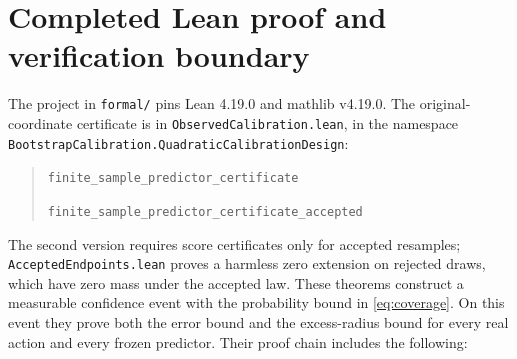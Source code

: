 \documentclass[11pt]{article}
\begin{document}
\section{Completed Lean proof and verification boundary}

The project in \texttt{formal/} pins Lean 4.19.0 and mathlib v4.19.0.
The original-coordinate certificate is in
\texttt{ObservedCalibration.lean}, in the namespace
\texttt{BootstrapCalibration.QuadraticCalibrationDesign}:
\begin{quote}\small
\texttt{finite\_sample\_predictor\_certificate}\par
\texttt{finite\_sample\_predictor\_certificate\_accepted}
\end{quote}
The second version requires score certificates only for accepted resamples;
\texttt{AcceptedEndpoints.lean} proves a harmless zero extension on rejected
draws, which have zero mass under the accepted law. These theorems construct
a measurable confidence event with the probability bound in
\eqref{eq:coverage}. On this event they prove both the error bound and the
excess-radius bound for every real action and every frozen predictor.
Their proof chain includes the following:
\end{document}
